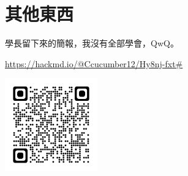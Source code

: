 \section{其他東西}
    學長留下來的簡報，我沒有全部學會，QwQ。
    
    \url{https://hackmd.io/@Ccucumber12/Hy8nj-fxt#}

    \includegraphics[width=0.3\textwidth]{../Images/Math.png}